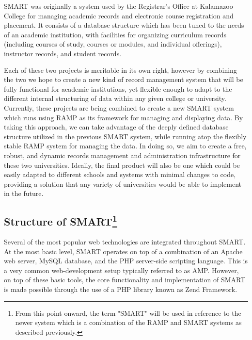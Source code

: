 \documentclass[12pt]{article}
\begin{document}
SMART was originally a system used by the Registrar's Office at Kalamazoo College for managing academic records and electronic course registration and placement. It consists of a database structure which has been tuned to the needs of an academic institution, with facilities for organizing curriculum records (including courses of study, courses or modules, and individual offerings), instructor records, and student records.

Each of these two projects is meritable in its own right, however by combining the two we hope to create a new kind of record management system that will be fully functional for academic institutions, yet flexible enough to adapt to the different internal structuring of data within any given college or university. Currently, these projects are being combined to create a new SMART system which runs using RAMP as its framework for managing and displaying data. By taking this approach, we can take advantage of the deeply defined database structure utilized in the previous SMART system, while running atop the flexibly stable RAMP system for managing the data. In doing so, we aim to create a free, robust, and dynamic records management and administration infrastructure for these two universities. Ideally, the final product will also be one which could be easily adapted to different schools and systems with minimal changes to code, providing a solution that any variety of universities would be able to implement in the future.

\subsection[Structure of SMART]{Structure of SMART\footnote{From this point onward, the term "SMART" will be used in reference to the newer system which is a combination of the RAMP and SMART systems as described previously.}}

Several of the most popular web technologies are integrated throughout SMART. At the most basic level, SMART operates on top of a combination of an Apache web server, MySQL database, and the PHP server-side scripting language. This is a very common web-development setup typically referred to as AMP. However, on top of these basic tools, the core functionality and implementation of SMART is made possible through the use of a PHP library known as Zend Framework.
\end{document}
